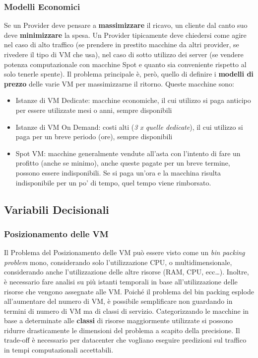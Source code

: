 \documentclass{article}
\providecommand{\tightlist}{%
		  \setlength{\itemsep}{0pt}\setlength{\parskip}{0pt}}
\begin{document}
		\subsubsection{Modelli Economici}\label{modelli-economici}
		Se un Provider deve pensare a \textbf{massimizzare} il ricavo, un cliente
		dal canto suo deve \textbf{minimizzare} la spesa. Un Provider tipicamente deve chiedersi come agire nel caso di alto traffico (se prendere in prestito macchine da altri provider, se rivedere il tipo di VM che usa), nel caso di sotto utilizzo dei server (se vendere potenza computazionale con macchine Spot e quanto sia conveniente rispetto al solo tenerle spente). Il problema principale è, però, quello di definire i \textbf{modelli di prezzo} delle varie VM per massimizzarne il ritorno.
		Queste macchine sono:
		
		\begin{itemize}
		\tightlist
		\item
		  Istanze di VM Dedicate: macchine economiche, il cui utilizzo
		  si paga anticipo per essere utilizzate mesi o anni, sempre disponibili
		\item
		  Istanze di VM On Demand: costi alti (\emph{3 x quelle
		  dedicate}), il cui utilizzo si paga per un breve periodo (ore), sempre
		  disponibili
		\item
		  Spot VM: macchine generalmente vendute all'asta con l'intento
		  di fare un profitto (anche se minimo), anche queste pagate per un
		  breve termine, possono essere indisponibili. Se si paga un'ora
		  e la macchina risulta indisponibile per un po' di tempo, quel tempo
		  viene rimborsato.
		\end{itemize}
		
		
		\subsection{Variabili Decisionali}\label{variabili-decisionali}
		\subsubsection{Posizionamento delle VM}\label{posizionamento-delle-vm}
		Il Problema del Posizionamento delle VM può essere visto come un
		\textit{bin packing problem} mono, considerando solo l'utilizzazione CPU, o multidimensionale, considerando anche l'utilizzazione delle altre risorse (RAM, CPU, ecc\ldots). Inoltre, è necessario fare analisi su più istanti temporali in base all'utilizzazione delle risorse che vengono assegnate alle VM. Poiché il problema del bin packing esplode all'aumentare del numero di VM, è possibile semplificare non guardando in termini di numero di
		VM ma di classi di servizio. Categorizzando le macchine in base a determinate alle \textbf{classi} di risorse maggiormente utilizzate si possono ridurre drasticamente le dimensioni del problema a scapito della precisione. Il trade-off è necessario per datacenter che vogliano eseguire predizioni sul traffico in tempi computazionali accettabili.
		
\end{document}
